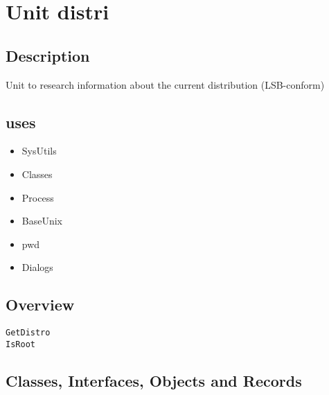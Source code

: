 \documentclass{report}
\newif\ifpdf
\begin{document}
\chapter{Unit distri}
\label{distri}
\section{Description}
Unit to research information about the current distribution (LSB{-}conform)
\section{uses}
\begin{itemize}
\item \begin{ttfamily}SysUtils\end{ttfamily}\item \begin{ttfamily}Classes\end{ttfamily}\item \begin{ttfamily}Process\end{ttfamily}\item \begin{ttfamily}BaseUnix\end{ttfamily}\item \begin{ttfamily}pwd\end{ttfamily}\item \begin{ttfamily}Dialogs\end{ttfamily}\end{itemize}
\section{Overview}
\begin{description}
\item[\texttt{\begin{ttfamily}TDistroInfo\end{ttfamily} record}]
\end{description}
\begin{description}
\item[\texttt{GetDistro}]
\item[\texttt{IsRoot}]
\end{description}
\section{Classes, Interfaces, Objects and Records}
\ifpdf
\end{document}
